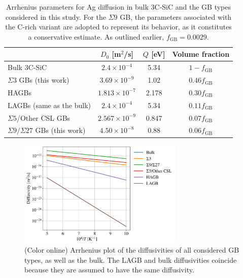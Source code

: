 \documentclass[%
preprint,
amsmath,amssymb,
aps,
]{revtex4-2}
\newcommand{\?}{\stackrel{?}{=}}
\begin{document}
\begin{table}[h!]
\centering
\footnotesize
\caption{Arrhenius parameters for Ag diffusion in bulk 3C‑SiC and the GB types considered in this study. For the $\Sigma9$ GB, the parameters associated with the C-rich variant are adopted to represent its behavior, as it constitutes a conservative estimate. As outlined earlier, $f_\text{GB} = 0.0029$.}
\label{tab:ArrheniusParams}
\begin{tabular}{lccc}
\hline
 & $D_0$ [m$^{2}$/s] & $Q$ [eV] & Volume fraction \\
\hline
Bulk 3C-SiC \cite{Jiang2021} & $2.4 \times 10^{-4}$ & 5.34 & $1 - f_\text{GB}$ \\
$\Sigma3$ GBs (this work) & $3.69 \times 10^{-9}$ & 1.02 & $0.46 f_\text{GB}$ \\
HAGBs \cite{Jiang2021} & $1.813 \times 10^{-7}$ & 2.178 & $0.30 f_\text{GB}$ \\
LAGBs (same as the bulk) & $2.4 \times 10^{-4}$ & 5.34 & $0.11 f_\text{GB}$ \\
$\Sigma5$/Other CSL GBs \cite{Aagesen2022} & $2.567 \times 10^{-9}$ & 0.847 & $0.07 f_\text{GB}$ \\
$\Sigma9/\Sigma27$ GBs (this work) & $4.50 \times 10^{-8}$ & 0.88 & $0.06 f_\text{GB}$ \\
\hline
\end{tabular}
\label{Tab:Values}
\end{table}

\begin{figure}[h!]
\centering
\includegraphics[width=0.7\textwidth]{All_D_Plot.png}
\caption{(Color online) Arrhenius plot of the diffusivities of all considered GB types, as well as the bulk. The LAGB and bulk diffusivities coincide because they are assumed to have the same diffusivity.}
\label{Fig:ArrheniusAll}
\end{figure}
\end{document}
